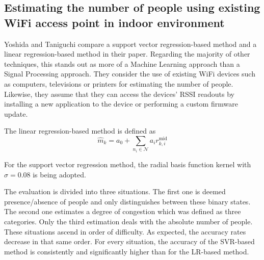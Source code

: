 \documentclass[conference]{IEEEtran}
\begin{document}
\subsection{Estimating the number of people using existing WiFi access point in indoor environment}
Yoshida and Taniguchi \cite{Yoshida} compare a support vector regression-based method and a linear regression-based method in their paper. Regarding the majority of other techniques, this stands out as more of a Machine Learning approach than a Signal Processing approach. They consider the use of existing WiFi devices such as computers, televisions or printers for estimating the number of people. Likewise, they assume that they can access the devices' RSSI readouts by installing a new application to the device or performing a custom firmware update.
\par
The linear regression-based method is defined as
\begin{equation}
	\hat{m}_{k} = a_0 + \sum\limits_{n_i \in \mathcal{N}} a_i r^{\textrm{mid}}_{k,i}
\end{equation}


For the support vector regression method, the radial basis function kernel with $\sigma = 0.08$ is being adopted.
\par
The evaluation is divided into three situations. The first one is deemed presence/absence of people and only distinguishes between these binary states. The second one estimates a degree of congestion which was defined as three categories. Only the third estimation deals with the absolute number of people. These situations ascend in order of difficulty. As expected, the accuracy rates decrease in that same order. For every situation, the accuracy of the SVR-based method is consistently and significantly higher than for the LR-based method.
\end{document}
